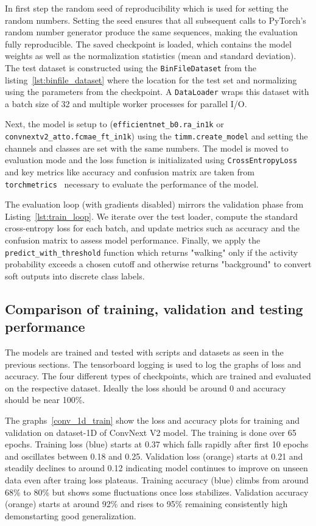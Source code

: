 In first step the random seed of reproducibility which is used for setting the random numbers. Setting the seed ensures that all subsequent calls to PyTorch's random number generator produce the same sequences, making the evaluation fully reproducible. The saved checkpoint is loaded, which contains the model weights as well as the normalization statistics (mean and standard deviation). The test dataset is constructed using the \texttt{BinFileDataset} from the listing~\ref{lst:binfile_dataset} where the location for the test set and normalizing using the parameters from the checkpoint. A \texttt{DataLoader} wraps this dataset with a batch size of 32 and multiple worker processes for parallel I/O. 

Next, the model is setup to (\texttt{efficientnet\_b0.ra\_in1k} or \texttt{convnextv2\allowbreak\_atto.fcmae\_ft\_in1k}) using the \texttt{timm.create\_model} and setting the channels and classes are set with the same numbers. The model is moved to evaluation mode and the loss function is initializated using \texttt{CrossEntropyLoss} and key metrics like accuracy and confusion matrix are taken from \texttt{torchmetrics}~ \cite{torchmetrics} necessary to evaluate the performance of the model.

The evaluation loop (with gradients disabled) mirrors the validation phase from Listing~\ref{lst:train_loop}.  We iterate over the test loader, compute the standard cross-entropy loss for each batch, and update metrics such as accuracy and the confusion matrix to assess model performance.  Finally, we apply the \texttt{predict\_with\_threshold} function which returns "walking" only if the activity probability exceeds a chosen cutoff and otherwise returns "background" to convert soft outputs into discrete class labels.

\subsection{Comparison of training, validation and testing performance}
\label{sec:comp}
The models are trained and tested with scripts and datasets as seen in the previous sections. The tensorboard logging is used to log the graphs of loss and accuracy. The four different types of checkpoints, which are trained and evaluated on the respective dataset. Ideally the loss should be around 0 and accuracy should be near 100\%.

The graphs~\ref{conv_1d_train} show the loss and accuracy plots for training and validation on dataset-1D of ConvNext V2 model. The training is done over 65 epochs. Training loss (blue) starts at 0.37 which falls rapidly after first 10 epochs and oscillates between 0.18 and 0.25. Validation loss (orange) starts at 0.21 and steadily declines to around 0.12 indicating model continues to improve on unseen data even after traing loss plateaus. Training accuracy (blue) climbs from around 68\% to 80\% but shows some fluctuations once loss stabilizes. Validation accuracy (orange) starts at around 92\% and rises to 95\% remaining consistently high demonstarting good generalization.

